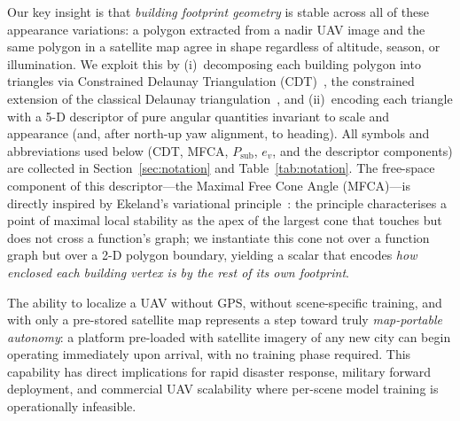 \documentclass[10pt]{article}
\theoremstyle{plain}
\theoremstyle{definition}
\begin{document}
Our key insight is that \emph{building footprint geometry} is stable across
all of these appearance variations: a polygon extracted from a nadir UAV image
and the same polygon in a satellite map agree in shape regardless of altitude,
season, or illumination.
We exploit this by (i)~decomposing each building polygon into triangles via
Constrained Delaunay Triangulation (CDT)~\cite{chew1989cdt}, the
constrained extension of the classical Delaunay triangulation~\cite{delaunay1934},
and (ii)~encoding each triangle with a 5-D descriptor of pure angular
quantities invariant to scale and appearance (and, after north-up yaw
alignment, to heading).
All symbols and abbreviations used below (CDT, MFCA, $P_{\mathrm{sub}}$,
$e_v$, and the descriptor components) are collected in
Section~\ref{sec:notation} and Table~\ref{tab:notation}.
The free-space component of this descriptor---the Maximal Free Cone Angle
(MFCA)---is directly inspired by Ekeland's variational principle~\cite{ekeland1974}:
the principle characterises a point of maximal local stability as the apex
of the largest cone that touches but does not cross a function's graph;
we instantiate this cone not over a function graph but over a 2-D polygon
boundary, yielding a scalar that encodes \emph{how enclosed each building vertex
is by the rest of its own footprint}.

The ability to localize a UAV without GPS, without scene-specific training,
and with only a pre-stored satellite map represents a step toward truly
\emph{map-portable autonomy}: a platform pre-loaded with satellite imagery of
any new city can begin operating immediately upon arrival, with no training
phase required.
This capability has direct implications for rapid disaster response, military
forward deployment, and commercial UAV scalability where per-scene model
training is operationally infeasible.
\end{document}
